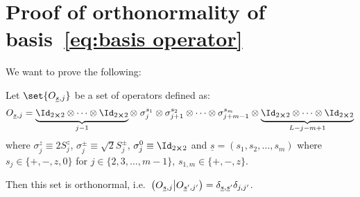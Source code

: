 \chapter{Proof of orthonormality of basis~\eqref{eq:basis operator}\label{app:orthonormality}}
\thispagestyle{chapterBeginStyle}


We want to prove the following:

\begin{proposition}
    Let \(\set{O_{\underline{s},j}}\) be a set of operators defined as:
    \begin{equation}
        O_{\underline{s},j}= \underbrace{\Id_{2\cross 2} \otimes \cdots
        \otimes \Id_{2\cross 2}}_{j-1} \otimes \; \sigma_{j}^{s_{1}} \otimes \sigma_{j+1}^{s_{2}} \otimes
        \cdots \otimes \sigma_{j+m-1}^{s_{m}} \otimes 
        \underbrace{\Id_{2\cross 2} \otimes \cdots \otimes \Id_{2\cross 2}}_{L-j-m+1}
    \end{equation}
    where \(\sigma_j^z \equiv 2 S^z_j\), \(\sigma_j^{\pm} \equiv \sqrt{2} S_j^{\pm}\),
    \(\sigma^{0}_j \equiv \Id_{2\cross 2}\) and \(\underline{s} = \left(s_1, s_2,\ldots,
     s_m\right)\) where \(s_j \in \{+,-,z,0\}\) for \(j \in \{2,3,\ldots,m-1\}\), \(s_{1,m} \in \{+,-,z\}\).
     
    Then this set is orthonormal, i.e.\ \( \left(O_{\underline{s},j} \middle| O_{\underline{s}^{\prime},j^{\prime}}\right)
    =\delta_{\underline{s},\underline{s}^{\prime}}\delta_{j,j^{\prime}}\).
\end{proposition}

